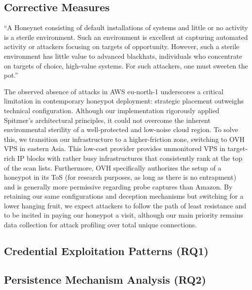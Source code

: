 \documentclass{cls/ULBreport}
\begin{document}
\subsection{Corrective Measures}

\enquote{A Honeynet consisting of default installations of systems and little or no activity is a sterile
environment. Such an environment is excellent at capturing automated activity or attackers
focusing on targets of opportunity. However, such a sterile environment has little value to
advanced blackhats, individuals who concentrate on targets of choice, high-value systems.
For such attackers, one must sweeten the pot.} \autocite[Ch.~11, p.~259]{spitzner2002honeypots}

The observed absence of attacks in AWS eu-north-1 underscores a critical limitation in contemporary honeypot deployment: strategic placement outweighs technical configuration. Although our implementation rigorously applied Spitzner’s architectural principles, it could not overcome the inherent environmental sterility of a well-protected and low-noise cloud region. To solve this, we transition our infrastructure to a higher-friction zone, switching to OVH VPS in eastern Asia. This low-cost provider provides unmonitored VPS in target-rich IP blocks with rather busy infrastructures that consistently rank at the top of the scan lists. Furthermore, OVH specifically authorizes the setup of a honeypot in its ToS (for research purposes, as long as there is no entrapment) and is generally more permissive regarding probe captures than Amazon. By retaining our same configurations and deception mechanisms but switching for a lower hanging fruit, we expect attackers to follow the path of least resistance and to be incited in paying our honeypot a visit, although our main priority remains data collection for attack profiling over total unique connections. 



\subsection{Credential Exploitation Patterns (RQ1)}




\subsection{Persistence Mechanism Analysis (RQ2)}
\end{document}
